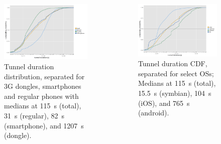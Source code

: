 \documentclass{beamer}
\begin{document}
\begin{frame}
	\begin{columns}[T]
		\begin{figure}
			\includegraphics[width=\columnwidth]{extras/R-tunnel-duration-device-type.png}
			\caption{Tunnel duration distribution, separated for 3G dongles, smartphones and regular phones with medians at \SI{115}{\second} (total), \SI{31}{\second} (regular), \SI{82}{\second} (smartphone), and \SI{1207}{\second} (dongle).}
		\end{figure}

		\begin{figure}
			\includegraphics[width=\columnwidth]{extras/R-tunnel-duration-operating-system.png}
			\caption{Tunnel duration CDF, separated for select OSs; Medians at \SI{115}{\second} (total), \SI{15.5}{\second} (symbian), \SI{104}{\second} (iOS), and \SI{765}{\second} (android).}
		\end{figure}
	\end{columns}
\end{frame}
\end{document}
